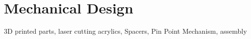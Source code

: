 \chapter{Mechanical Design}
\label{chap:7}

3D printed parts, laser cutting acrylics, Spacers, Pin Point Mechanism, assembly
